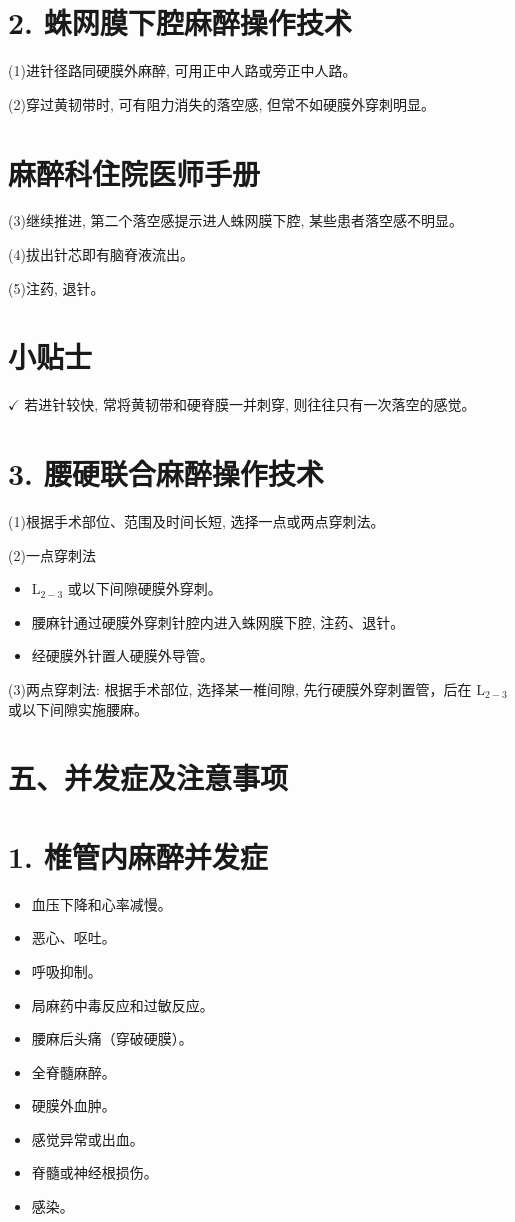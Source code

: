 \documentclass[10pt]{article}
\begin{document}
\section*{2. 蛛网膜下腔麻醉操作技术}
(1)进针径路同硬膜外麻醉, 可用正中人路或旁正中人路。

(2)穿过黄韧带时, 可有阻力消失的落空感, 但常不如硬膜外穿刺明显。

\section*{麻醉科住院医师手册}
(3)继续推进, 第二个落空感提示进人蛛网膜下腔, 某些患者落空感不明显。

(4)拔出针芯即有脑脊液流出。

(5)注药, 退针。

\section*{小贴士}
$\checkmark$ 若进针较快, 常将黄韧带和硬脊膜一并刺穿, 则往往只有一次落空的感觉。

\section*{3. 腰硬联合麻醉操作技术}
(1)根据手术部位、范围及时间长短, 选择一点或两点穿刺法。

(2)一点穿刺法

\begin{itemize}
  \item $\mathrm{L}_{2-3}$ 或以下间隙硬膜外穿刺。
  \item 腰麻针通过硬膜外穿刺针腔内进入蛛网膜下腔, 注药、退针。
  \item 经硬膜外针置人硬膜外导管。
\end{itemize}

(3)两点穿刺法: 根据手术部位, 选择某一椎间隙, 先行硬膜外穿刺置管，后在 $\mathrm{L}_{2-3}$ 或以下间隙实施腰麻。

\section*{五、并发症及注意事项}
\section*{1. 椎管内麻醉并发症}
\begin{itemize}
  \item 血压下降和心率减慢。
  \item 恶心、呕吐。
  \item 呼吸抑制。
  \item 局麻药中毒反应和过敏反应。
  \item 腰麻后头痛（穿破硬膜）。
  \item 全脊髓麻醉。
  \item 硬膜外血肿。
  \item 感觉异常或出血。
  \item 脊髓或神经根损伤。
  \item 感染。
\end{itemize}
\end{document}
